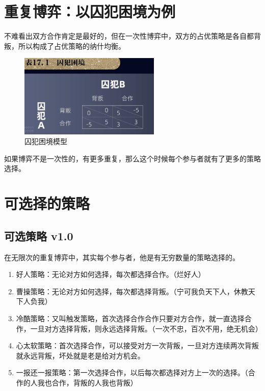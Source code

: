 \documentclass[12pt, a4paper]{article}
\begin{document}
\begin{CJK*}{UTF8}{gbsn}
        \clearpage
        \section{重复博弈：以囚犯困境为例}
        不难看出双方合作肯定是最好的，但在一次性博弈中，双方的占优策略是各自都背叛，所以构成了占优策略的纳什均衡。

        \begin{figure}[htbp]
            \centering
            \includegraphics[width=0.6\textwidth]{./figures/catch2023-08-02-09.08.38.png}
            \caption{囚犯困境模型}
        \end{figure}

        如果博弈不是一次性的，有更多重复，那么这个时候每个参与者就有了更多的策略选择。

        \section{可选择的策略}

        \subsection{可选策略 v1.0}
        在无限次的重复博弈中，其实每个参与者，他是有无穷数量的策略选择的。
        \begin{enumerate}
            \item 好人策略：无论对方如何选择，每次都选择合作。（烂好人）
            \item 曹操策略：无论对方如何选择，每次都选择背叛。（宁可我负天下人，休教天下人负我）
            \item 冷酷策略：又叫触发策略，首次选择合作合作只要对方合作，就一直选择合作，一旦对方选择背叛，则永远选择背叛。（一次不忠，百次不用，绝无机会）
            \item 心太软策略：首次选择合作，可以接受对方一次背叛，一旦对方连续两次背叛就永远背叛，坏处就是老是给对方机会。
            \item 一报还一报策略：第一次选择合作，以后每次都选择对方上一次的选择。（合作的人我也合作，背叛的人我也背叛）
        \end{enumerate}


\end{CJK*}
\end{document}
